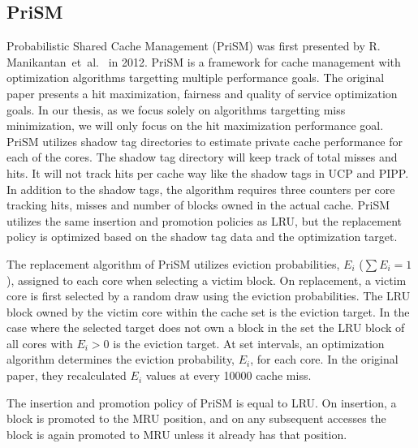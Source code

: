 \subsection{PriSM}
\label{sec:background:algorithms:prism}

Probabilistic Shared Cache Management (PriSM) was first presented by R. Manikantan~et~al.~\cite{Manikantan2012} in 2012.
PriSM is a framework for cache management with optimization algorithms targetting multiple performance goals.
The original paper presents a hit maximization, fairness and quality of service optimization goals.
In our thesis, as we focus solely on algorithms targetting miss minimization, we will only focus on the hit maximization performance goal.
PriSM utilizes shadow tag directories to estimate private cache performance for each of the cores.
The shadow tag directory will keep track of total misses and hits.
It will not track hits per cache way like the shadow tags in UCP and PIPP.
In addition to the shadow tags, the algorithm requires three counters per core tracking hits, misses and number of blocks owned in the actual cache.
PriSM utilizes the same insertion and promotion policies as LRU, but the replacement policy is optimized based on the shadow tag data and the optimization target.

The replacement algorithm of PriSM utilizes eviction probabilities, $E_i$ ($\sum{E_i} = 1$), assigned to each core when selecting a victim block.
On replacement, a victim core is first selected by a random draw using the eviction probabilities.
The LRU block owned by the victim core within the cache set is the eviction target.
In the case where the selected target does not own a block in the set the LRU block of all cores with $E_i > 0$ is the eviction target.
At set intervals, an optimization algorithm determines the eviction probability, $E_i$, for each core.
In the original paper, they recalculated $E_i$ values at every 10000 cache miss.

The insertion and promotion policy of PriSM is equal to LRU.
On insertion, a block is promoted to the MRU position, and on any subsequent accesses the block is again promoted to MRU unless it already has that position.


